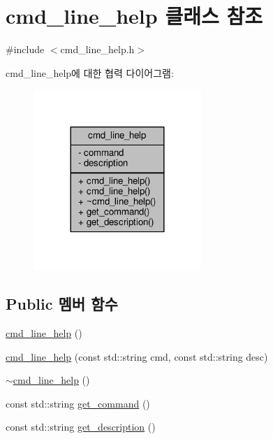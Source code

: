 \hypertarget{classcmd__line__help}{}\section{cmd\+\_\+line\+\_\+help 클래스 참조}
\label{classcmd__line__help}


{\ttfamily \#include $<$cmd\+\_\+line\+\_\+help.\+h$>$}



cmd\+\_\+line\+\_\+help에 대한 협력 다이어그램\+:
\nopagebreak
\begin{figure}[H]
\begin{center}
\leavevmode
\includegraphics[width=180pt]{classcmd__line__help__coll__graph}
\end{center}
\end{figure}
\subsection*{Public 멤버 함수}
\begin{DoxyCompactItemize}
\item 
\hyperlink{classcmd__line__help_ad2fe61152c3eb670c168f463699a6de7}{cmd\+\_\+line\+\_\+help} ()
\item 
\hyperlink{classcmd__line__help_a21f361ae019bd99d4de35b0dd974617d}{cmd\+\_\+line\+\_\+help} (const std\+::string cmd, const std\+::string desc)
\item 
\hyperlink{classcmd__line__help_a064dbe91a91b8a81af94f668c528d7ca}{$\sim$cmd\+\_\+line\+\_\+help} ()
\item 
const std\+::string \hyperlink{classcmd__line__help_a9b35385430e98005af489548f7538e1f}{get\+\_\+command} ()
\item 
const std\+::string \hyperlink{classcmd__line__help_aad2ffe98475074e36c1c8e79eb735f3e}{get\+\_\+description} ()
\end{DoxyCompactItemize}
